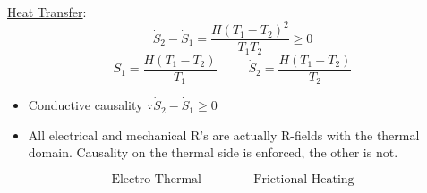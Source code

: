 \documentclass[ 12pt, twocolumn]{article}    %
\begin{document}
\noindent
\underline{Heat Transfer}:
\begin{equation*}
\dot{S}_2 - \dot{S}_1 = \frac{H(T_1-T_2)^2}{T_1 T_2} \geq 0
\end{equation*}
\begin{equation*}
\dot{S}_1 =\frac{H(T_1-T_2)}{T_1} \hspace{30pt} \dot{S}_2 = \frac{H(T_1-T_2)}{T_2}
\end{equation*}
\begin{center}
    \begin{footnotesize}
    \end{footnotesize}
\end{center}
\begin{itemize}
    \item Conductive causality \(\because \dot{S}_2-\dot{S}_1\geq0\)
    \item All electrical and mechanical R's are actually R-fields with the thermal domain. Causality on the thermal side is enforced, the other is not.
\end{itemize}
\begin{equation*}
    \text{Electro-Thermal} \hspace{50pt} \text{Frictional Heating}
\end{equation*}
\begin{center}
    \begin{footnotesize}
        \hspace{10pt}
    \end{footnotesize}
\end{center}
\end{document}

